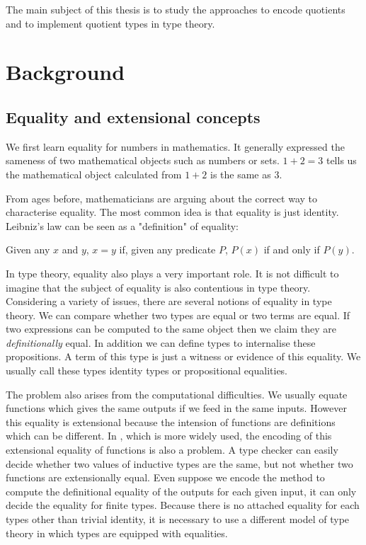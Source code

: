 The main subject of this thesis is to study the approaches to encode
quotients and to implement quotient types in type theory.

\section{Background}

\subsection{Equality and extensional concepts}

We first learn equality for numbers in mathematics. It generally
expressed the sameness of two mathematical objects such as numbers or sets.
$1+2=3$ tells us the mathematical object calculated from $1+2$ is the
same as $3$.

From ages before, mathematicians are arguing about the correct way to
characterise equality. The most common idea is that equality is just
identity. Leibniz's law can be seen as a "definition" of
equality:

Given any $x$ and $y$, $x = y$ if, given any predicate $P$, $P(x)$ if and only
if $P(y)$.

In type theory, equality also plays a very important role.
It is not difficult to imagine that the subject of equality is also
contentious in type theory. Considering a variety of issues, there are
several notions of equality in type theory.
We can compare whether two types are equal or two terms are equal. If two
expressions can be computed to the same object then we claim they are
 \emph{definitionally} equal.  In addition we can define types to
 internalise these propositions. A term of this type is just a witness or evidence of
 this equality. We usually call these types identity types or
 propositional equalities.

The problem also arises from the computational difficulties. We
usually equate functions which gives the same outputs if we feed in the
same inputs. However this equality is extensional because the intension
of functions are definitions which can be different. In \itt, which is
more widely used, the encoding of this extensional equality of
functions is also a problem. A type checker can easily decide whether two
values of inductive types are the same, but not whether two functions
are extensionally equal. Even suppose we encode the method to compute
the definitional equality of the outputs for each given input, it can
only decide the equality for finite types. Because there is no
attached equality for each types other than trivial identity, it is
necessary to use a different model of type theory in which types are
equipped with equalities.

